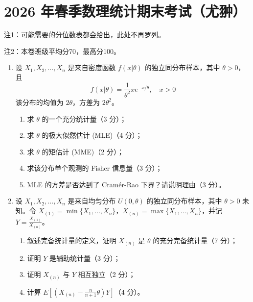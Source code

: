 \section{2026 年春季数理统计期末考试（尤翀）}

注1：可能需要的分位数表都会给出，此处不再罗列。

注2：本卷班级平均分70，最高分100。
\begin{enumerate}
\item 设 $X_1, X_2, \dots, X_n$ 是来自密度函数 $f(x|\theta)$ 的独立同分布样本，其中 $\theta > 0$，且
\[
f(x|\theta)=\frac{1}{\theta^2} x e^{-x/\theta}, \quad x>0
\]
该分布的均值为 $2\theta$，方差为 $2\theta^2$。

\begin{enumerate}
\item 求 $\theta$ 的一个充分统计量（3 分）；
\item 求 $\theta$ 的极大似然估计 (MLE)（4 分）；
\item 求 $\theta$ 的矩估计 (MME)（2 分）；
\item 求该分布单个观测的 Fisher 信息量（3 分）；
\item MLE 的方差是否达到了 Cram\'er-Rao 下界？请说明理由（3 分）。
\end{enumerate}

\item 设 $X_1, X_2, \dots, X_n$ 是来自均匀分布 $U(0, \theta)$ 的独立同分布样本，其中 $\theta > 0$ 未知。令 $X_{(1)} = \min\{X_1, \dots, X_n\}$，$X_{(n)} = \max\{X_1, \dots, X_n\}$，并记 $Y = \frac{X_{(1)}}{X_{(n)}}$。

\begin{enumerate}
\item 叙述完备统计量的定义，证明 $X_{(n)}$ 是 $\theta$ 的充分完备统计量（7 分）；
\item 证明 $Y$ 是辅助统计量（3 分）；
\item 证明 $X_{(n)}$ 与 $Y$ 相互独立（2 分）；
\item 计算 $E\left[\left(X_{(n)} - \frac{n}{n+1}\theta\right)Y\right]$（4 分）。
\end{enumerate}


\end{enumerate}
